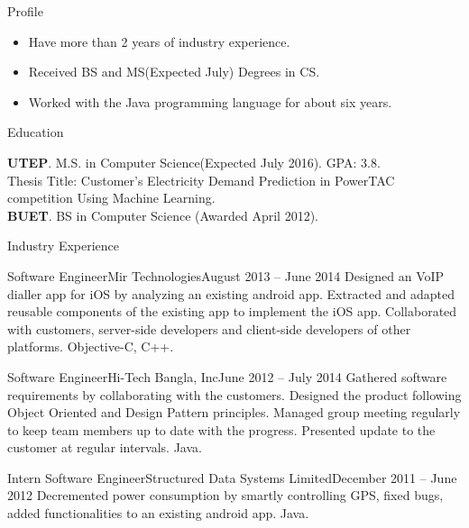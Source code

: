 \documentclass[]{mcdowellcv}
\begin{document}
	\makeheader
	
	\begin{cvsection}{Profile}
	\begin{cvsubsection}{}{}{}
		\begin{itemize}
				\item Have more than 2 years of industry experience.
				\item Received BS and MS(Expected July) Degrees in CS.
				\item Worked with the Java programming language for about six years.
			\end{itemize}
	\end{cvsubsection}
	\end{cvsection}
	
	\begin{cvsection}{Education}
		\begin{cvsubsection}{}{}{}
				\textbf{UTEP}. M.S. in Computer Science(Expected July 2016). GPA: 3.8. \\
				Thesis Title: Customer's Electricity Demand Prediction in PowerTAC competition Using Machine Learning. \\
				\textbf{BUET}. BS in Computer Science (Awarded April 2012).  
		\end{cvsubsection}
	\end{cvsection}

	\begin{cvsection}{Industry Experience}
		
		\begin{cvsubsection}{Software Engineer}{Mir Technologies}{August 2013 -- June 2014}
		Designed an VoIP dialler app for iOS by analyzing an existing android app. Extracted and adapted reusable components of the existing app to implement the iOS app. Collaborated with customers, server-side developers and client-side developers of other platforms. Objective-C, C++.
\end{cvsubsection}		
		\begin{cvsubsection}{Software Engineer}{Hi-Tech Bangla, Inc}{June 2012 -- July 2014}	
 Gathered software requirements by collaborating with the customers. Designed the product following Object Oriented and Design Pattern principles. Managed  group meeting regularly to keep  team members up to date with the progress. Presented  update to the customer at regular intervals. Java.
			
		\end{cvsubsection}

		\begin{cvsubsection}{Intern Software Engineer}{Structured Data Systems Limited}{December 2011 -- June 2012}	
			Decremented power consumption by smartly controlling GPS, fixed bugs, added functionalities to an existing android app. Java.
		\end{cvsubsection}
	\end{cvsection}
	
\end{document}
